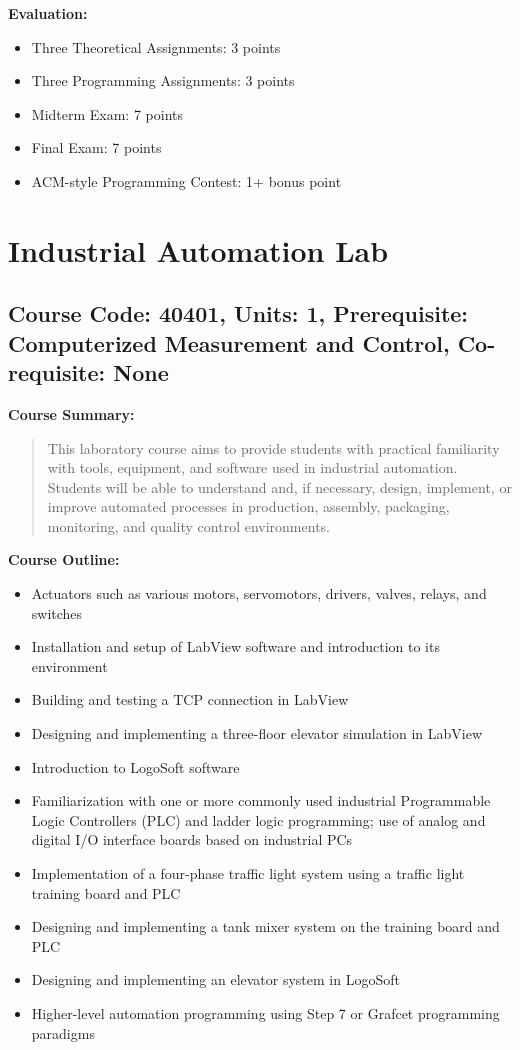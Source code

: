 \documentclass[12pt]{article}
\begin{document}
\textbf{Evaluation:}
\begin{itemize}
    \item Three Theoretical Assignments: 3 points
    \item Three Programming Assignments: 3 points
    \item Midterm Exam: 7 points
    \item Final Exam: 7 points
    \item ACM-style Programming Contest: 1+ bonus point
\end{itemize}

\newpage

\section{Industrial Automation Lab}
\subsection*{Course Code: 40401, Units: 1, Prerequisite: Computerized Measurement and Control, Co-requisite: None}

\textbf{Course Summary:} 
\begin{quote}
   This laboratory course aims to provide students with practical familiarity with tools, equipment, and software used in industrial automation. Students will be able to understand and, if necessary, design, implement, or improve automated processes in production, assembly, packaging, monitoring, and quality control environments.
\end{quote}

\textbf{Course Outline:}
\begin{itemize}
    \item Actuators such as various motors, servomotors, drivers, valves, relays, and switches
    \item Installation and setup of LabView software and introduction to its environment
    \item Building and testing a TCP connection in LabView
    \item Designing and implementing a three-floor elevator simulation in LabView
    \item Introduction to LogoSoft software
    \item Familiarization with one or more commonly used industrial Programmable Logic Controllers (PLC) and ladder logic programming; use of analog and digital I/O interface boards based on industrial PCs
    \item Implementation of a four-phase traffic light system using a traffic light training board and PLC
    \item Designing and implementing a tank mixer system on the training board and PLC
    \item Designing and implementing an elevator system in LogoSoft
    \item Higher-level automation programming using Step 7 or Grafcet programming paradigms
\end{itemize}
\end{document}
